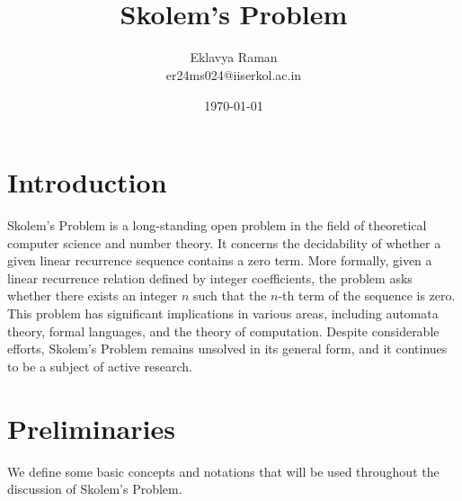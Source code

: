 \documentclass[openany]{book}
\begin{document}
\title{\Large{} \\ \vspace{5pt}
\large{Skolem's Problem}}
\author{Eklavya Raman \\ \vspace{5pt} er24ms024@iiserkol.ac.in \\ \vspace{5pt}}
\date{\today}
\maketitle
\tableofcontents
\listoftheorems[
    show=mytheorem,
    title={List of Theorems}]


\chapter*{Introduction}
Skolem's Problem is a long-standing open problem in the field of theoretical computer science and number theory. It concerns the decidability of whether a given linear recurrence sequence contains a zero term. More formally, given a linear recurrence relation defined by integer coefficients, the problem asks whether there exists an integer $n$ such that the $n$-th term of the sequence is zero. This problem has significant implications in various areas, including automata theory, formal languages, and the theory of computation. Despite considerable efforts, Skolem's Problem remains unsolved in its general form, and it continues to be a subject of active research.

\chapter{Preliminaries}
We define some basic concepts and notations that will be used throughout the discussion of Skolem's Problem.
\end{document}

